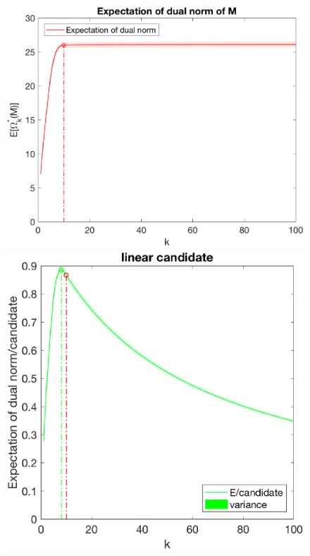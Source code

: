 \documentclass[12pt]{article}
\begin{document}
\begin{figure}[h]
    \begin{minipage}[c]{.3\linewidth}
        \centering
        \includegraphics[width=\linewidth]{Fig/dualnorm-u0rand-k0-10.eps}
    \end{minipage}
    \hfill%
    \begin{minipage}[c]{.3\linewidth}
        \centering
        \includegraphics[width=\linewidth]{Fig/dualnorm-u0rand-k0-10-candidatelin.eps}

\end{minipage}
\end{figure}
\end{document}
